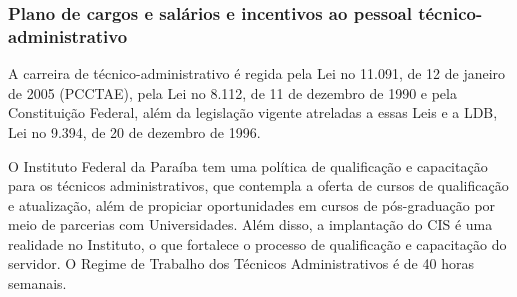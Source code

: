 \newpage
 
\subsubsection{Plano de cargos e sal\'arios e incentivos ao pessoal t\'ecnico-administrativo}

A carreira de técnico-administrativo é regida pela Lei no 11.091, de 12 de janeiro de 2005 (PCCTAE), pela Lei no 8.112, de 11 de dezembro de 1990 e pela Constituição Federal, além da legislação vigente atreladas a essas Leis e a LDB, Lei no 9.394, de 20 de dezembro de 1996. 

O Instituto Federal da Paraíba tem uma política de qualificação e capacitação para os técnicos administrativos, que contempla a oferta de cursos de qualificação e atualização, além de propiciar oportunidades em cursos de pós-graduação por meio de parcerias com Universidades. Além disso, a implantação do CIS é uma realidade no Instituto, o que fortalece o processo de qualificação e capacitação do servidor. O Regime de Trabalho dos Técnicos Administrativos é de 40 horas semanais.


